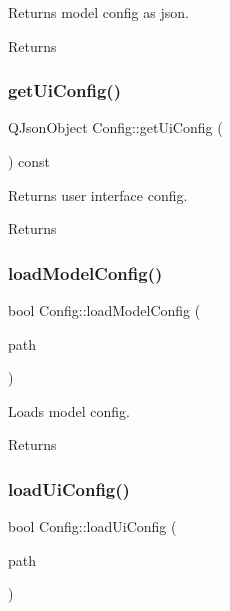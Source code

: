 Returns model config as json. 

\begin{DoxyReturn}{Returns}

\end{DoxyReturn}
\mbox{\label{class_config_ab3828a5d249dc41d32da68fd9048c4fd}} 
\subsubsection{\texorpdfstring{get\+Ui\+Config()}{getUiConfig()}}
{\footnotesize\ttfamily Q\+Json\+Object Config\+::get\+Ui\+Config (\begin{DoxyParamCaption}{ }\end{DoxyParamCaption}) const}



Returns user interface config. 

\begin{DoxyReturn}{Returns}

\end{DoxyReturn}
\mbox{\label{class_config_aeafd352da1f8e8596038fba4ffc8ce35}} 
\subsubsection{\texorpdfstring{load\+Model\+Config()}{loadModelConfig()}}
{\footnotesize\ttfamily bool Config\+::load\+Model\+Config (\begin{DoxyParamCaption}\item[{const Q\+String \&}]{path }\end{DoxyParamCaption})}



Loads model config. 

\begin{DoxyReturn}{Returns}

\end{DoxyReturn}
\mbox{\label{class_config_af74ffa7c4476a31403415a11a6cf1108}} 
\subsubsection{\texorpdfstring{load\+Ui\+Config()}{loadUiConfig()}}
{\footnotesize\ttfamily bool Config\+::load\+Ui\+Config (\begin{DoxyParamCaption}\item[{const Q\+String \&}]{path }\end{DoxyParamCaption})}



